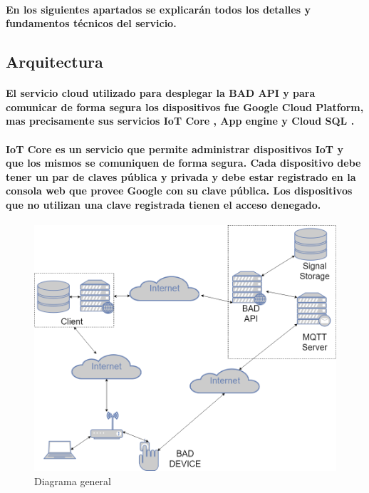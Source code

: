 \documentclass{article}
\begin{document}
\paragraph{
En los siguientes apartados se explicarán todos los detalles y fundamentos técnicos del servicio.
}

\subsection{Arquitectura}
\paragraph{
El servicio cloud utilizado para desplegar la BAD API y para comunicar de forma segura los dispositivos fue Google Cloud Platform, mas precisamente sus servicios IoT Core \cite{GoogleIotCore}, App engine \cite{GoogleAppEngine} y Cloud SQL \cite{GoogleCloudSQL}.
}
\paragraph{
IoT Core es un servicio que permite administrar dispositivos IoT y que los mismos se comuniquen de forma segura. Cada dispositivo debe tener un par de claves pública y privada y debe estar registrado en la consola web que provee Google con su clave pública. Los dispositivos que no utilizan una clave registrada tienen el acceso denegado.
}

\begin{figure}[ht]
    \centering
    \includegraphics[width=\textwidth]{diagrama_general.png}%
    \caption{Diagrama general}
    \label{fig:generaldiagram}
\end{figure}
\end{document}
